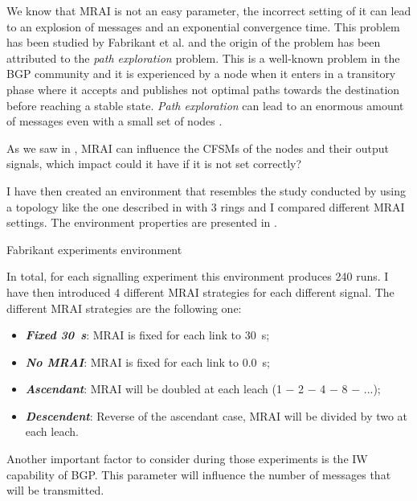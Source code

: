 We know that \ac{MRAI} is not an easy parameter, the incorrect setting of
it can lead to an explosion of messages and an exponential convergence time.
This problem has been studied by Fabrikant et al. \cite{fabrikant2011there} and
the origin of the problem has been attributed to the \textit{path exploration}
problem.
This is a well-known problem in the \ac{BGP} community and it is experienced
by a node when it enters in a transitory phase where it accepts and publishes not
optimal paths towards the destination before reaching a stable state.
\textit{Path exploration} can lead to an enormous amount of messages even with
a small set of nodes \cite{deshpande2004impact}.

As we saw in , \ac{MRAI} can influence the
\ac{CFSM}s of the nodes and their output signals, which impact could it have
if it is not set correctly?

I have then created an environment that resembles the study conducted by
\cite{fabrikant2011there} using a topology like the one described in 
with \num{3} rings and I compared different \ac{MRAI} settings.
The environment properties are presented in .

\begin{table}[h]
	
	\caption{Fabrikant experiments environment}
	\label{tbl:fabrikant_environment}
\end{table}

In total, for each signalling experiment this environment produces \num{240} runs.
I have then introduced \num{4} different \ac{MRAI} strategies for each different
signal.
The different \ac{MRAI} strategies are the following one:
\begin{itemize}
	\item \textbf{\textit{Fixed \SI{30}{\second}}}: \ac{MRAI} is fixed for each link to \SI{30}{\second};
	\item \textbf{\textit{No \ac{MRAI}}}: \ac{MRAI} is fixed for each link to \SI{0.0}{\second};
	\item \textbf{\textit{Ascendant}}: \ac{MRAI} will be doubled at each leach (1 − 2 − 4 − 8 − ...);
	\item \textbf{\textit{Descendent}}: Reverse of the ascendant case, \ac{MRAI} will be divided by two at each leach.
\end{itemize}

Another important factor to consider during those experiments is the \ac{IW}
capability of \ac{BGP}.
This parameter will influence the number of messages
that will be transmitted.

